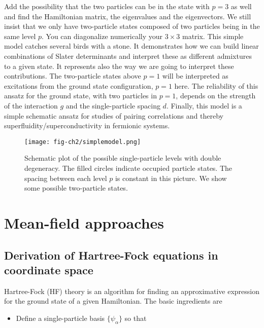 \documentclass[graybox,sectrefs,envcountresetchap,open=right]{svmonodo}
\newenvironment{doconceexercise}{}{}
\begin{document}
\begin{doconceexercise}
Add the possibility that the two particles can be in the state with $p=3$ as well and find the Hamiltonian matrix, the eigenvalues and the eigenvectors. We still insist that we only have two-particle states composed of two particles being in the same level $p$. You can diagonalize numerically your $3\times 3$ matrix.
This simple model catches several birds with a stone. It demonstrates how we can build linear combinations
of Slater determinants and interpret these as different admixtures to a given state. It represents also the way we are going to interpret these contributions.  The two-particle states above $p=1$ will be interpreted as 
excitations from the ground state configuration, $p=1$ here.  The reliability of this ansatz for the ground state, 
with two particles in $p=1$,
depends on the strength of the interaction $g$ and the single-particle spacing $d$.
Finally, this model is a simple schematic ansatz for studies of pairing correlations and thereby superfluidity/superconductivity  
in fermionic systems. 


\begin{figure}[t]
  \centerline{\texttt{[image: fig-ch2/simplemodel.png]}}
  \caption{
  Schematic plot of the possible single-particle levels with double degeneracy. The filled circles indicate occupied particle states. The spacing between each level $p$ is constant in this picture. We show some possible two-particle states.
  }
\end{figure}




\end{doconceexercise}


\chapter{Mean-field approaches}
\label{ch:meanfield}

\section{Derivation of Hartree-Fock equations in coordinate space}

Hartree-Fock (HF) theory is an algorithm for finding an approximative expression for the ground state of a given Hamiltonian. The basic ingredients are
\begin{itemize}
  \item Define a single-particle basis $\{\psi_{\alpha}\}$ so that
\end{itemize}
\end{document}
